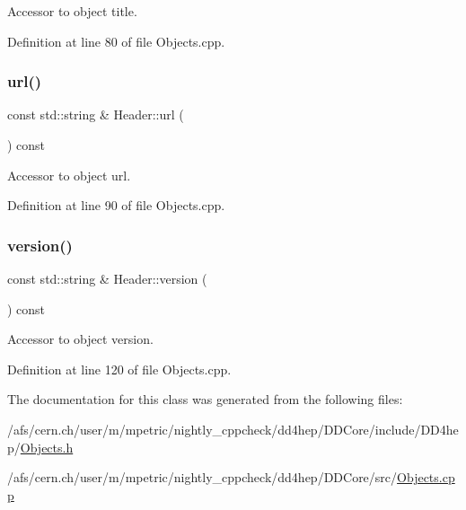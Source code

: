 Accessor to object title. 



Definition at line 80 of file Objects.\+cpp.

\hypertarget{class_d_d4hep_1_1_geometry_1_1_header_a1c44ca4ccbe7e7861ac8e777f43469d3}{}\label{class_d_d4hep_1_1_geometry_1_1_header_a1c44ca4ccbe7e7861ac8e777f43469d3} 
\subsubsection{\texorpdfstring{url()}{url()}}
{\footnotesize\ttfamily const std\+::string \& Header\+::url (\begin{DoxyParamCaption}{ }\end{DoxyParamCaption}) const}



Accessor to object url. 



Definition at line 90 of file Objects.\+cpp.

\hypertarget{class_d_d4hep_1_1_geometry_1_1_header_ab3a4584adab1cfb1befe3ccdfc029f01}{}\label{class_d_d4hep_1_1_geometry_1_1_header_ab3a4584adab1cfb1befe3ccdfc029f01} 
\subsubsection{\texorpdfstring{version()}{version()}}
{\footnotesize\ttfamily const std\+::string \& Header\+::version (\begin{DoxyParamCaption}{ }\end{DoxyParamCaption}) const}



Accessor to object version. 



Definition at line 120 of file Objects.\+cpp.



The documentation for this class was generated from the following files\+:\begin{DoxyCompactItemize}
\item 
/afs/cern.\+ch/user/m/mpetric/nightly\+\_\+cppcheck/dd4hep/\+D\+D\+Core/include/\+D\+D4hep/\hyperlink{_objects_8h}{Objects.\+h}\item 
/afs/cern.\+ch/user/m/mpetric/nightly\+\_\+cppcheck/dd4hep/\+D\+D\+Core/src/\hyperlink{_objects_8cpp}{Objects.\+cpp}\end{DoxyCompactItemize}
